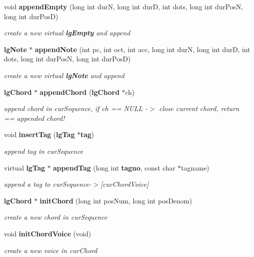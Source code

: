 \begin{CompactItemize}
void {\bf append\-Empty} (long int dur\-N, long int dur\-D, int dots, long int dur\-Pos\-N, long int dur\-Pos\-D)
\begin{CompactList}\small\item\em create a new virtual {\bf lg\-Empty} and append \item\end{CompactList}\item 
{\bf lg\-Note} $\ast$ {\bf append\-Note} (int pc, int oct, int acc, long int dur\-N, long int dur\-D, int dots, long int dur\-Pos\-N, long int dur\-Pos\-D)
\begin{CompactList}\small\item\em create a new virtual {\bf lg\-Note} and append \item\end{CompactList}\item 
{\bf lg\-Chord} $\ast$ {\bf append\-Chord} ({\bf lg\-Chord} $\ast$ch)
\begin{CompactList}\small\item\em append chord in cur\-Sequence, if ch == NULL -$>$ close current chord, return == appended chord! \item\end{CompactList}\item 
void {\bf insert\-Tag} ({\bf lg\-Tag} $\ast${\bf tag})
\begin{CompactList}\small\item\em append tag in cur\-Sequence \item\end{CompactList}\item 
virtual {\bf lg\-Tag} $\ast$ {\bf append\-Tag} (long int {\bf tagno}, const char $\ast$tagname)
\begin{CompactList}\small\item\em append a tag to cur\-Sequence-$>$[cur\-Chord\-Voice] \item\end{CompactList}\item 
{\bf lg\-Chord} $\ast$ {\bf init\-Chord} (long int pos\-Num, long int pos\-Denom)
\begin{CompactList}\small\item\em create a new chord in cur\-Sequence \item\end{CompactList}\item 
void {\bf init\-Chord\-Voice} (void)
\begin{CompactList}\small\item\em create a new voice in cur\-Chord \item\end{CompactList}\item 

\end{CompactItemize}
